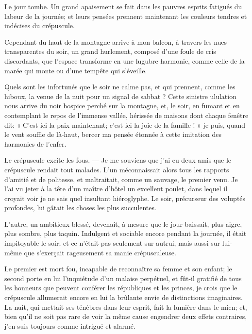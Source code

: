 
Le jour tombe. Un grand apaisement se fait dans les pauvres esprits
fatigués du labeur de la journée; et leurs pensées prennent maintenant
les couleurs tendres et indécises du crépuscule.

Cependant du haut de la montagne arrive à mon balcon, à travers les nues
transparentes du soir, un grand hurlement, composé
d’une foule de cris discordants, que
l’espace transforme en une lugubre harmonie, comme
celle de la marée qui monte ou d’une tempête qui
s’éveille.

Quels sont les infortunés que le soir ne calme pas, et qui prennent,
comme les hiboux, la venue de la nuit pour un signal de sabbat ? Cette
sinistre ululation nous arrive du noir hospice perché sur la montagne,
et, le soir, en fumant et en contemplant le repos de
l’immense vallée, hérissée de maisons dont chaque
fenêtre dit: « C’est ici la paix maintenant;
c’est ici la joie de la famille ! » je puis, quand le
vent souffle de là{}-haut, bercer ma pensée étonnée à cette imitation
des harmonies de l’enfer.

Le crépuscule excite les fous. --- Je me souviens que
j’ai eu deux amis que le crépuscule rendait tout
malades. L’un méconnaissait alors tous les rapports
d’amitié et de politesse, et maltraitait, comme un
sauvage, le premier venu. Je l’ai vu jeter à la tête
d’un maître d’hôtel un excellent
poulet, dans lequel il croyait voir je ne sais quel insultant
hiéroglyphe. Le soir, précurseur des voluptés profondes, lui gâtait les
choses les plus succulentes.

L’autre, un ambitieux blessé, devenait, à mesure que le
jour baissait, plus aigre, plus sombre, plus taquin. Indulgent et
sociable encore pendant la journée, il était impitoyable le soir; et ce
n’était pas seulement sur autrui, mais aussi sur
lui{}-même que s’exerçait rageusement sa manie
crépusculeuse.

Le premier est mort fou, incapable de reconnaître sa femme et son
enfant; le second porte en lui l’inquiétude
d’un malaise perpétuel, et fût{}-il gratifié de tous
les honneurs que peuvent conférer les républiques et les princes, je
crois que le crépuscule allumerait encore en lui la brûlante envie de
distinctions imaginaires. La nuit, qui mettait ses ténèbres dans leur
esprit, fait la lumière dans le mien; et, bien qu’il
ne soit pas rare de voir la même cause engendrer deux effets
contraires, j’en suis toujours comme intrigué et
alarmé.

